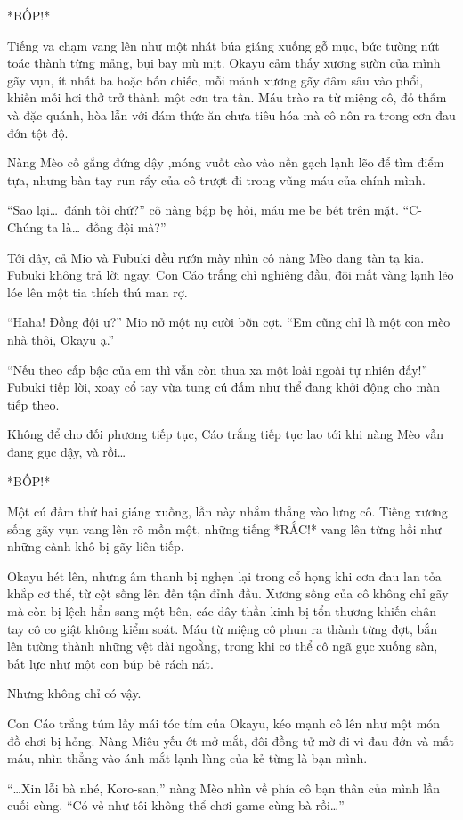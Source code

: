 \documentclass[../main.tex]{subfiles}
\begin{document}
*BỐP!*

Tiếng va chạm vang lên như một nhát búa giáng xuống gỗ mục, bức tường nứt toác thành từng mảng, bụi bay mù mịt. Okayu cảm thấy xương sườn của mình gãy vụn, ít nhất ba hoặc bốn chiếc, mỗi mảnh xương gãy đâm sâu vào phổi, khiến mỗi hơi thở trở thành một cơn tra tấn. Máu trào ra từ miệng cô, đỏ thẫm và đặc quánh, hòa lẫn với đám thức ăn chưa tiêu hóa mà cô nôn ra trong cơn đau đớn tột độ.

Nàng Mèo cố gắng đứng dậy ,móng vuốt cào vào nền gạch lạnh lẽo để tìm điểm tựa, nhưng bàn tay run rẩy của cô trượt đi trong vũng máu của chính mình.

``Sao lại\dots\ đánh tôi chứ?'' cô nàng bập bẹ hỏi, máu me be bét trên mặt. ``C-Chúng ta là\dots\ đồng đội mà?''

Tới đây, cả Mio và Fubuki đều rướn mày nhìn cô nàng Mèo đang tàn tạ kia. Fubuki không trả lời ngay. Con Cáo trắng chỉ nghiêng đầu, đôi mắt vàng lạnh lẽo lóe lên một tia thích thú man rợ.

``Haha! Đồng đội ư?'' Mio nở một nụ cười bỡn cợt. ``Em cũng chỉ là một con mèo nhà thôi, Okayu ạ.''

``Nếu theo cấp bậc của em thì vẫn còn thua xa một loài ngoài tự nhiên đấy!'' Fubuki tiếp lời, xoay cổ tay vừa tung cú đấm như thể đang khởi động cho màn tiếp theo.

Không để cho đối phương tiếp tục, Cáo trắng tiếp tục lao tới khi nàng Mèo vẫn đang gục dậy, và rồi\dots

*BỐP!*

Một cú đấm thứ hai giáng xuống, lần này nhắm thẳng vào lưng cô. Tiếng xương sống gãy vụn vang lên rõ mồn một, những tiếng *RẮC!* vang lên từng hồi như những cành khô bị gãy liên tiếp.

Okayu hét lên, nhưng âm thanh bị nghẹn lại trong cổ họng khi cơn đau lan tỏa khắp cơ thể, từ cột sống lên đến tận đỉnh đầu. Xương sống của cô không chỉ gãy mà còn bị lệch hẳn sang một bên, các dây thần kinh bị tổn thương khiến chân tay cô co giật không kiểm soát. Máu từ miệng cô phun ra thành từng đợt, bắn lên tường thành những vệt dài ngoằng, trong khi cơ thể cô ngã gục xuống sàn, bất lực như một con búp bê rách nát.

Nhưng không chỉ có vậy.

Con Cáo trắng túm lấy mái tóc tím của Okayu, kéo mạnh cô lên như một món đồ chơi bị hỏng. Nàng Miêu yếu ớt mở mắt, đôi đồng tử mờ đi vì đau đớn và mất máu, nhìn thẳng vào ánh mắt lạnh lùng của kẻ từng là bạn mình.

``\dots Xin lỗi bà nhé, Koro-san,'' nàng Mèo nhìn về phía cô bạn thân của mình lần cuối cùng. ``Có vẻ như tôi không thể chơi game cùng bà rồi\dots''
\end{document}
